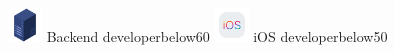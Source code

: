 \documentclass[blue]{pastelcv}              %
\begin{document}
\begin{paracol}{2}

  {\large\bf \includegraphics[width=9mm]{server}}
  {Backend developer}{below}{60}
  {\large\bf \includegraphics[width=9mm]{ios}}
  {iOS developer}{below}{50}
\vspace{0.5em}

\newcommand{\iconsizep}{6mm}


\end{paracol}
\end{document}
